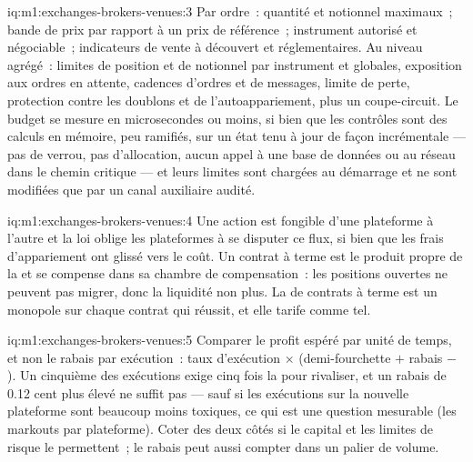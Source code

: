 \begin{solution}{iq:m1:exchanges-brokers-venues:3}
Par ordre~: quantité et notionnel maximaux~; bande de prix par rapport à un prix de
référence~; instrument autorisé et négociable~; indicateurs de vente à découvert et réglementaires.
Au niveau agrégé~: limites de position et de notionnel par instrument et globales, exposition
aux ordres en attente, cadences d'ordres et de messages, limite de perte, protection contre les doublons et
de l'autoappariement, plus un coupe-circuit. Le budget se mesure en microsecondes ou
moins, si bien que les contrôles sont des calculs en mémoire, peu ramifiés, sur un état
tenu à jour de façon incrémentale --- pas de verrou, pas d'allocation, aucun appel à une base de données ou au réseau
dans le chemin critique --- et leurs limites sont chargées au démarrage et ne sont modifiées que par
un canal auxiliaire audité.
\end{solution}

\begin{solution}{iq:m1:exchanges-brokers-venues:4}
Une action est fongible d'une plateforme à l'autre et la loi oblige les plateformes à se disputer
ce flux, si bien que les frais d'appariement ont glissé vers le coût. Un contrat à terme est le produit
propre de la  et se compense dans sa chambre de compensation~: les positions ouvertes ne peuvent
pas migrer, donc la liquidité non plus. La  de contrats à terme est un monopole sur chaque
contrat qui réussit, et elle tarife comme tel.
\end{solution}

\begin{solution}{iq:m1:exchanges-brokers-venues:5}
Comparer le profit espéré par unité de temps, et non le rabais par exécution~: taux d'exécution
$\times$ (demi-fourchette $+$ rabais $-$ ). Un cinquième des
exécutions exige cinq fois la  pour rivaliser, et un rabais de 0.12 cent
plus élevé ne suffit pas --- sauf si les exécutions sur la nouvelle plateforme sont beaucoup
moins toxiques, ce qui est une question mesurable (les markouts par plateforme). Coter
des deux côtés si le capital et les limites de risque le permettent~; le rabais peut aussi compter
dans un palier de volume.
\end{solution}

